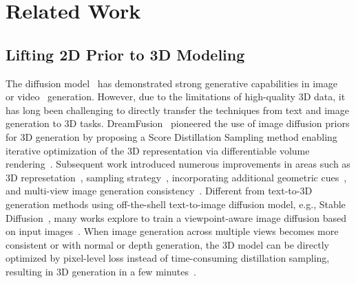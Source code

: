 \section{Related Work} 
\subsection{Lifting 2D Prior to 3D Modeling}
The diffusion model~\cite{DBLP:conf/nips/HoJA20} has demonstrated strong generative capabilities in image~\cite{rombach2022high,DBLP:conf/icml/RameshPGGVRCS21} or video~\cite{DBLP:conf/iclr/SingerPH00ZHYAG23,DBLP:conf/iccv/WuGWLGSHSQS23} generation. However, due to the limitations of high-quality 3D data, it has long been challenging to directly transfer the techniques from text and image generation to 3D tasks.
DreamFusion~\cite{DBLP:conf/iclr/PooleJBM23} pioneered the use of image diffusion priors for 3D generation by proposing a Score Distillation Sampling method enabling iterative optimization of the 3D representation via differentiable volume rendering~\cite{DBLP:conf/eccv/MildenhallSTBRN20}.
Subsequent work introduced numerous improvements in areas such as 3D represetation~\cite{DBLP:conf/cvpr/Lin0TTZHKF0L23,yi2024gaussiandreamer,DBLP:conf/iclr/TangRZ0Z24}, sampling strategy~\cite{DBLP:conf/nips/Wang00BL0023,DBLP:conf/cvpr/WangDLYS23,liang2024luciddreamer,DBLP:conf/aaai/Zou0CHSZ24}, incorporating additional geometric cues~\cite{DBLP:conf/iccv/TangWZZYM023,long2024wonder3d}, and multi-view image generation consistency~\cite{DBLP:conf/iclr/ShiWYMLY24,DBLP:conf/iclr/LiuLZLLKW24,DBLP:journals/corr/abs-2312-02201}.
Different from text-to-3D generation methods using off-the-shell text-to-image diffusion model, e.g., Stable Diffusion~\cite{rombach2022high}, many works explore to train a viewpoint-aware image diffusion based on input images~\cite{DBLP:conf/iccv/LiuWHTZV23,DBLP:conf/iccv/ChanNCBPLAMKW23,DBLP:journals/corr/abs-2310-15110}.
When image generation across multiple views becomes more consistent or with normal or depth generation, the 3D model can be directly optimized by pixel-level loss instead of time-consuming distillation sampling, resulting in 3D generation in a few minutes~\cite{long2024wonder3d,DBLP:journals/corr/abs-2405-20343,DBLP:journals/corr/abs-2405-11616}.

